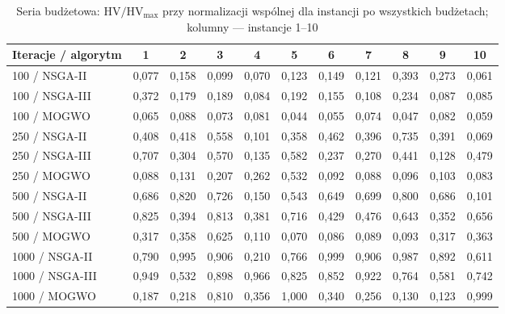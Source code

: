 \begin{table}[htbp]
    \small
    \centering
    \caption{Seria budżetowa: $\mathrm{HV}/\mathrm{HV}_{\max}$ przy normalizacji wspólnej dla instancji po wszystkich budżetach; kolumny --- instancje 1--10}
    \label{tab:per_run_budget}
    \begin{tabular}{l c c c c c c c c c c }
        \hline
        Iteracje / algorytm & 1 & 2 & 3 & 4 & 5 & 6 & 7 & 8 & 9 & 10 \\
        \hline
        100 / NSGA-II & 0{,}077 & 0{,}158 & 0{,}099 & 0{,}070 & 0{,}123 & 0{,}149 & 0{,}121 & 0{,}393 & 0{,}273 & 0{,}061 \\
        100 / NSGA-III & 0{,}372 & 0{,}179 & 0{,}189 & 0{,}084 & 0{,}192 & 0{,}155 & 0{,}108 & 0{,}234 & 0{,}087 & 0{,}085 \\
        100 / MOGWO & 0{,}065 & 0{,}088 & 0{,}073 & 0{,}081 & 0{,}044 & 0{,}055 & 0{,}074 & 0{,}047 & 0{,}082 & 0{,}059 \\
        250 / NSGA-II & 0{,}408 & 0{,}418 & 0{,}558 & 0{,}101 & 0{,}358 & 0{,}462 & 0{,}396 & 0{,}735 & 0{,}391 & 0{,}069 \\
        250 / NSGA-III & 0{,}707 & 0{,}304 & 0{,}570 & 0{,}135 & 0{,}582 & 0{,}237 & 0{,}270 & 0{,}441 & 0{,}128 & 0{,}479 \\
        250 / MOGWO & 0{,}088 & 0{,}131 & 0{,}207 & 0{,}262 & 0{,}532 & 0{,}092 & 0{,}088 & 0{,}096 & 0{,}103 & 0{,}083 \\
        500 / NSGA-II & 0{,}686 & 0{,}820 & 0{,}726 & 0{,}150 & 0{,}543 & 0{,}649 & 0{,}699 & 0{,}800 & 0{,}686 & 0{,}101 \\
        500 / NSGA-III & 0{,}825 & 0{,}394 & 0{,}813 & 0{,}381 & 0{,}716 & 0{,}429 & 0{,}476 & 0{,}643 & 0{,}352 & 0{,}656 \\
        500 / MOGWO & 0{,}317 & 0{,}358 & 0{,}625 & 0{,}110 & 0{,}070 & 0{,}086 & 0{,}089 & 0{,}093 & 0{,}317 & 0{,}363 \\
        1000 / NSGA-II & 0{,}790 & 0{,}995 & 0{,}906 & 0{,}210 & 0{,}766 & 0{,}999 & 0{,}906 & 0{,}987 & 0{,}892 & 0{,}611 \\
        1000 / NSGA-III & 0{,}949 & 0{,}532 & 0{,}898 & 0{,}966 & 0{,}825 & 0{,}852 & 0{,}922 & 0{,}764 & 0{,}581 & 0{,}742 \\
        1000 / MOGWO & 0{,}187 & 0{,}218 & 0{,}810 & 0{,}356 & 1{,}000 & 0{,}340 & 0{,}256 & 0{,}130 & 0{,}123 & 0{,}999 \\
        \hline
    \end{tabular}
\end{table}

